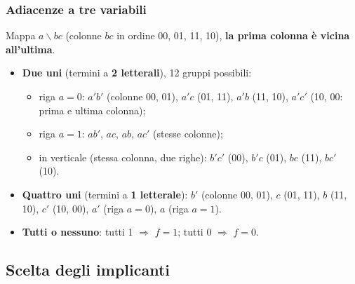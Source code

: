 \documentclass[12pt, a4paper]{article}
\begin{document}
\subsubsection{Adiacenze a tre variabili}
Mappa $a \backslash bc$ (colonne $bc$ in ordine 00, 01, 11, 10), \textbf{la prima colonna è vicina all'ultima}.
\begin{itemize}
    \item \textbf{Due uni} (termini a \textbf{2 letterali}), 12 gruppi possibili:
    \begin{itemize}
        \item riga $a = 0$: $a'b'$ (colonne 00, 01), $a'c$ (01, 11), $a'b$ (11, 10), $a'c'$ (10, 00: prima e ultima colonna);
        \item riga $a = 1$: $ab'$, $ac$, $ab$, $ac'$ (stesse colonne);
        \item in verticale (stessa colonna, due righe): $b'c'$ (00), $b'c$ (01), $bc$ (11), $bc'$ (10).
    \end{itemize}
    \item \textbf{Quattro uni} (termini a \textbf{1 letterale}): $b'$ (colonne 00, 01), $c$ (01, 11), $b$ (11, 10), $c'$ (10, 00), $a'$ (riga $a = 0$), $a$ (riga $a = 1$).
    \item \textbf{Tutti o nessuno}: tutti 1 $\Rightarrow$ $f = 1$; tutti 0 $\Rightarrow$ $f = 0$.
\end{itemize}

\subsection{Scelta degli implicanti}
\end{document}
